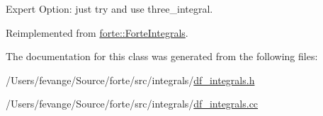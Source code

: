 Expert Option\+: just try and use three\+\_\+integral. 



Reimplemented from \mbox{\hyperlink{classforte_1_1_forte_integrals_a69292bc8e42a76e344cd01c4e3dd48d5}{forte\+::\+Forte\+Integrals}}.



The documentation for this class was generated from the following files\+:\begin{DoxyCompactItemize}
\item 
/\+Users/fevange/\+Source/forte/src/integrals/\mbox{\hyperlink{df__integrals_8h}{df\+\_\+integrals.\+h}}\item 
/\+Users/fevange/\+Source/forte/src/integrals/\mbox{\hyperlink{df__integrals_8cc}{df\+\_\+integrals.\+cc}}\end{DoxyCompactItemize}
